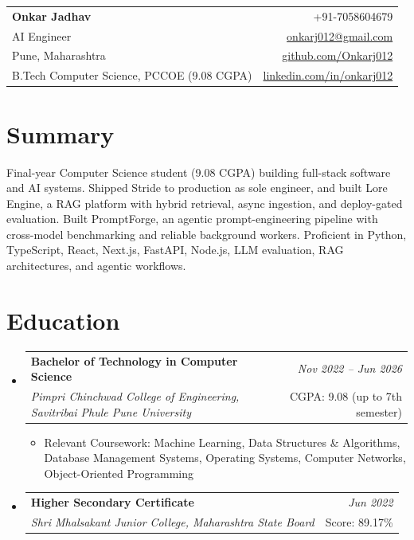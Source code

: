 \documentclass[a4paper,11pt]{article}
\makeatletter
\newcommand{\resumeSubheading}[4]{
\vspace{0.5mm}\item
    \begin{tabular*}{0.98\textwidth}[t]{l@{\extracolsep{\fill}}r}
        \textbf{#1} & \textit{\footnotesize{#4}} \\
        \textit{\footnotesize{#3}} & \footnotesize{#2}\\
    \end{tabular*}
    \vspace{-2.4mm}
}
\newcommand{\resumeSubHeadingListStart}{\begin{itemize}[leftmargin=*,labelsep=0mm]}
\newcommand{\resumeItemListStart}{\begin{justify}\begin{itemize}[leftmargin=3ex, rightmargin=2ex, noitemsep,labelsep=1.2mm,itemsep=0mm]\small}
\newcommand{\resumeSubHeadingListEnd}{\end{itemize}\vspace{2mm}}
\newcommand{\resumeItemListEnd}{\end{itemize}\end{justify}\vspace{-2mm}}
\newcommand{\name}{Onkar Jadhav}
\newcommand{\phone}{7058604679}
\newcommand{\emaila}{onkarj012@gmail.com}
\newcommand{\github}{github.com/Onkarj012}
\newcommand{\linkedin}{linkedin.com/in/onkarj012}
\makeatother
\begin{document}
\selectfont

\begin{tabularx}{\linewidth}{L r}
  \textbf{\Large \name} & {+91-\phone} \\
  {AI Engineer} & \href{mailto:\emaila}{\emaila} \\
  {Pune, Maharashtra} & \href{https://\github}{\github} \\
  {B.Tech Computer Science, PCCOE (9.08 CGPA)} & \href{https://\linkedin}{\linkedin}
\end{tabularx}
\vspace{-4mm}

\section{\textbf{Summary}}
\vspace{1mm}
\small{
Final-year Computer Science student (9.08 CGPA) building full-stack software and AI systems. Shipped Stride to production as sole engineer, and built Lore Engine, a RAG platform with hybrid retrieval, async ingestion, and deploy-gated evaluation. Built PromptForge, an agentic prompt-engineering pipeline with cross-model benchmarking and reliable background workers. Proficient in Python, TypeScript, React, Next.js, FastAPI, Node.js, LLM evaluation, RAG architectures, and agentic workflows.
}
\vspace{-3mm}

\section{\textbf{Education}}
  \resumeSubHeadingListStart
    \resumeSubheading
      {Bachelor of Technology in Computer Science}{CGPA: 9.08 (up to 7th semester)}
      {Pimpri Chinchwad College of Engineering, Savitribai Phule Pune University}{Nov 2022 -- Jun 2026}
      \resumeItemListStart
        \item {Relevant Coursework: Machine Learning, Data Structures \& Algorithms, Database Management Systems, Operating Systems, Computer Networks, Object-Oriented Programming}
      \resumeItemListEnd
    \resumeSubheading
      {Higher Secondary Certificate}{Score: 89.17\%}
      {Shri Mhalsakant Junior College, Maharashtra State Board}{Jun 2022}
  \resumeSubHeadingListEnd
\vspace{-5.5mm}

\end{document}

